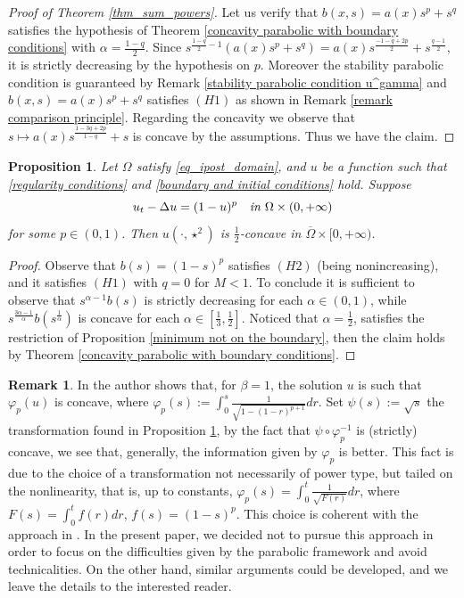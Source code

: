 \documentclass[11pt, reqno]{amsart}
\newtheorem{proposition}[lemma]{Proposition}
\theoremstyle{definition}
\newtheorem{remark}[lemma]{Remark}
\numberwithin{equation}{section}
\newcommand{\Omegabar}{\overline{\Omega}}
\begin{document}
\begin{proof}[Proof of Theorem \ref{thm_sum_powers}]
	Let us verify that $b(x, s)=a(x) s^p+s^q$ satisfies the hypothesis of Theorem \ref{concavity parabolic with boundary conditions} with $\alpha=\frac{1-q}{2}$. 
	Since $s^{\frac{1-q}{2}-1}(a(x) s^p+s^q)=a(x) s^{\frac{-1-q+2p}{2}}+s^{\frac{q-1}{2}}$, it is strictly decreasing by the hypothesis on $p$. 
	Moreover the stability parabolic condition is guaranteed by Remark \ref{stability parabolic condition u^gamma} and $b(x, s)=a(x) s^p+s^q$ satisfies \hyperlink{H1}{\( (H1) \)} 
	as shown in Remark \ref{remark comparison principle}.
	Regarding the concavity we observe that $s \mapsto a(x) s^{\frac{1-3q+2p}{1-q}} +s$ is concave by the assumptions. 
	Thus we have the claim.
\end{proof}

\begin{proposition}\label{prop_kenn88}
 	Let $\Omega$ satisfy \eqref{eq_ipost_domain}, and $u$ be a function such that \eqref{regularity conditions} and \eqref{boundary and initial conditions} hold.
Suppose
	\begin{equation*}
			u_t-\Delta u= (1-u)^p \quad\emph{in }\Omega\times (0,+\infty)
	\end{equation*}
	for some $p\in (0,1)$. 
	Then $u(\cdot, \star^{2})$ is $\frac{1}{2}$-concave in $\Omegabar \times [0,+\infty)$.
\end{proposition}

\begin{proof}
Observe that $b(s)=(1-s)^p$ satisfies \hyperlink{H2}{\( (H2) \)} (being nonincreasing), and it satisfies \hyperlink{H1}{\( (H1) \)} with $q=0$ for $M<1$.
To conclude it is sufficient to observe that $s^{\alpha-1} b(s)$ is strictly decreasing for each $\alpha \in (0,1)$, while $s^{\frac{3\alpha-1}{\alpha}}b(s^{\frac{1}{\alpha}})$ is concave for each $\alpha \in [\frac{1}{3}, \frac{1}{2}]$. 
Noticed that $\alpha=\frac{1}{2} $, satisfies the restriction of Proposition \ref{minimum not on the boundary}, then the claim holds by Theorem \ref{concavity parabolic with boundary conditions}.
\end{proof}

\begin{remark}
In \cite{kenningtonparabolic} the author shows that, for $\beta=1$, the solution $u$ is such that $\varphi_p(u)$ is concave, where $\varphi_p(s) := \int_0^s \frac{1}{\sqrt{1-(1-r)^{p+1}}
} dr$. 
Set $\psi(s):=\sqrt{s}$ the transformation found in Proposition \ref{prop_kenn88}, by the fact that $\psi \circ \varphi_p^{-1}$ is (strictly) concave, we see that, generally, the information given by $\varphi_p$ is better. 
This fact is due to the choice of a transformation not necessarily of power type, but tailed on the nonlinearity, that is, up to constants, $\varphi_p(s)=\int_0^t \frac{1}{\sqrt{F(r)}} dr$, where $F(s)=\int_0^t f(r) dr$, $f(s)=(1-s)^p$. 
This choice is coherent with the approach in \cite{AAGS2023,BMSplaplacian, GaSq24}. 
In the present paper, we decided not to pursue this approach in order to focus on the difficulties given by the parabolic framework and avoid technicalities. On the other hand, similar arguments could be developed, and we leave the details to the interested reader.
\end{remark}
\end{document}

